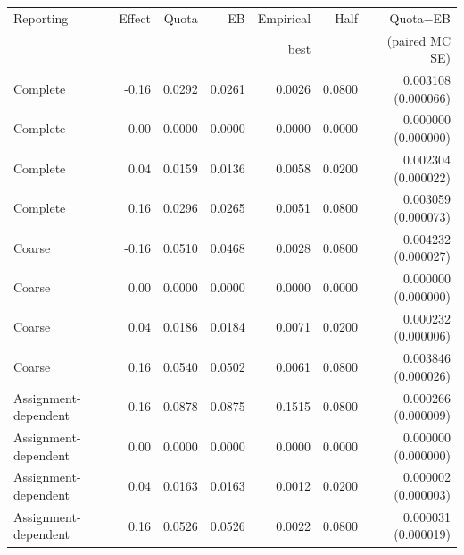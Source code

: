 \begin{tabular}{lrrrrrr}
\toprule
Reporting & Effect & Quota & EB & Empirical & Half & Quota$-$EB\\
 & & & & best & & (paired MC SE)\\
\midrule
Complete & -0.16 & 0.0292 & 0.0261 & 0.0026 & 0.0800 & 0.003108 (0.000066)\\
Complete & 0.00 & 0.0000 & 0.0000 & 0.0000 & 0.0000 & 0.000000 (0.000000)\\
Complete & 0.04 & 0.0159 & 0.0136 & 0.0058 & 0.0200 & 0.002304 (0.000022)\\
Complete & 0.16 & 0.0296 & 0.0265 & 0.0051 & 0.0800 & 0.003059 (0.000073)\\
Coarse & -0.16 & 0.0510 & 0.0468 & 0.0028 & 0.0800 & 0.004232 (0.000027)\\
Coarse & 0.00 & 0.0000 & 0.0000 & 0.0000 & 0.0000 & 0.000000 (0.000000)\\
Coarse & 0.04 & 0.0186 & 0.0184 & 0.0071 & 0.0200 & 0.000232 (0.000006)\\
Coarse & 0.16 & 0.0540 & 0.0502 & 0.0061 & 0.0800 & 0.003846 (0.000026)\\
Assignment-dependent & -0.16 & 0.0878 & 0.0875 & 0.1515 & 0.0800 & 0.000266 (0.000009)\\
Assignment-dependent & 0.00 & 0.0000 & 0.0000 & 0.0000 & 0.0000 & 0.000000 (0.000000)\\
Assignment-dependent & 0.04 & 0.0163 & 0.0163 & 0.0012 & 0.0200 & 0.000002 (0.000003)\\
Assignment-dependent & 0.16 & 0.0526 & 0.0526 & 0.0022 & 0.0800 & 0.000031 (0.000019)\\
\bottomrule
\end{tabular}
